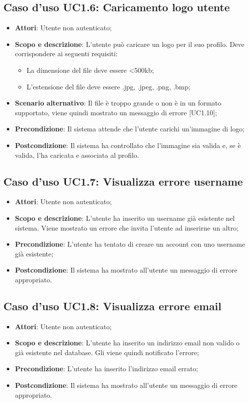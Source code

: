 \documentclass[12pt,a4paper,titlepage]{article}
\begin{document}
	\subsection{Caso d'uso UC1.6: Caricamento logo utente}
	\label{UC1.6}
	\begin{itemize}
		\item \textbf{Attori}: Utente non autenticato;
		\item \textbf{Scopo e descrizione}: L'utente può caricare un logo per il suo profilo. Deve corrispondere ai seguenti requisiti:
		\begin{itemize}
			\item La dimensione del file deve essere <500kb;
			\item L'estensione del file deve essere .jpg, .jpeg, .png, .bmp;
		\end{itemize}
		\item \textbf{Scenario alternativo}: Il file è troppo grande o non è in un formato supportato, viene quindi mostrato un messaggio di errore [UC1.10];
		\item \textbf{Precondizione}: Il sistema attende che l'utente carichi un'immagine di logo;
		\item \textbf{Postcondizione}: Il sistema ha controllato che l'immagine sia valida e, se è valida, l'ha caricata e associata al profilo.
	\end{itemize}
	\subsection{Caso d'uso UC1.7: Visualizza errore username}
	\label{UC1.7}
	\begin{itemize}
		\item \textbf{Attori}: Utente non autenticato;
		\item \textbf{Scopo e descrizione}: L'utente ha inserito un username già esistente nel sistema. Viene mostrato un errore che invita l'utente ad inserirne un altro;
		\item \textbf{Precondizione}: L'utente ha tentato di creare un account con uno username già esistente;
		\item \textbf{Postcondizione}: Il sistema ha mostrato all'utente un messaggio di errore appropriato.
	\end{itemize}
	\subsection{Caso d'uso UC1.8: Visualizza errore email}
	\label{UC1.8}
	\begin{itemize}
		\item \textbf{Attori}: Utente non autenticato;
		\item \textbf{Scopo e descrizione}: L'utente ha inserito un indirizzo email non valido o già esistente nel database. Gli viene quindi notificato l'errore;
		\item \textbf{Precondizione}: L'utente ha inserito l'indirizzo email errato;
		\item \textbf{Postcondizione}: Il sistema ha mostrato all'utente un messaggio di errore appropriato.
	\end{itemize}
\end{document}
